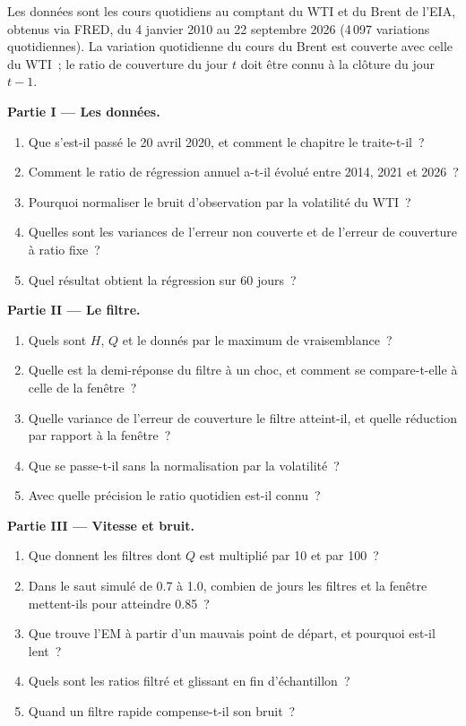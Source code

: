\begin{problem}\label{pb:qm:state-space-models-and-the-kalman-filter:1}
Les données sont les cours quotidiens au comptant du WTI et du Brent de l'EIA, obtenus via FRED, du 4 janvier 2010 au 22 septembre 2026 (4\,097 variations quotidiennes). La variation quotidienne du cours du Brent est
couverte avec celle du WTI~; le ratio de couverture du jour $t$ doit être connu à la clôture du jour $t - 1$.

\medskip\noindent\textbf{Partie I --- Les données.}
\begin{enumerate}
\item Que s'est-il passé le 20 avril 2020, et comment le chapitre le traite-t-il~?
\item Comment le ratio de régression annuel a-t-il évolué entre 2014, 2021 et 2026~?
\item Pourquoi normaliser le bruit d'observation par la volatilité du WTI~?
\item Quelles sont les variances de l'erreur non couverte et de l'erreur de couverture à ratio fixe~?
\item Quel résultat obtient la régression sur 60 jours~?
\end{enumerate}

\medskip\noindent\textbf{Partie II --- Le filtre.}
\begin{enumerate}[resume]
\item Quels sont $H$, $Q$ et le  donnés par le maximum de vraisemblance~?
\item Quelle est la demi-réponse du filtre à un choc, et comment se compare-t-elle à celle de la fenêtre~?
\item Quelle variance de l'erreur de couverture le filtre atteint-il, et quelle réduction par rapport à la fenêtre~?
\item Que se passe-t-il sans la normalisation par la volatilité~?
\item Avec quelle précision le ratio quotidien est-il connu~?
\end{enumerate}

\medskip\noindent\textbf{Partie III --- Vitesse et bruit.}
\begin{enumerate}[resume]
\item Que donnent les filtres dont $Q$ est multiplié par 10 et par 100~?
\item Dans le saut simulé de 0.7 à 1.0, combien de jours les filtres et la fenêtre mettent-ils pour atteindre 0.85~?
\item Que trouve l'EM à partir d'un mauvais point de départ, et pourquoi est-il lent~?
\item Quels sont les ratios filtré et glissant en fin d'échantillon~?
\item Quand un filtre rapide compense-t-il son bruit~?
\end{enumerate}


\end{problem}
